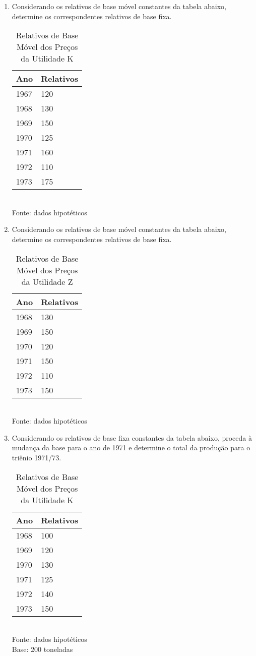 \begin{enumerate}[resume]
\item Considerando os relativos de base móvel constantes da tabela abaixo, determine os correspondentes relativos de base fixa.
	\begin{table}[!htb]
	\centering
	\caption{Relativos de Base Móvel dos Preços da Utilidade K}
	\begin{tabular}{ll}
	Ano & Relativos \\
	\hline 
	1967 & 120  \\
	1968 & 130  \\
	1969 & 150  \\
	1970 & 125  \\
	1971 & 160  \\
	1972 & 110  \\
	1973 & 175  \\		
	\end{tabular} 
	\\ Fonte: dados hipotéticos
	\end{table}
	
\item Considerando os relativos de base móvel constantes da tabela abaixo, determine os correspondentes relativos de base fixa.	
	\begin{table}[!htb]
	\centering
	\caption{Relativos de Base Móvel dos Preços da Utilidade Z}
	\begin{tabular}{ll}
	Ano & Relativos \\
	\hline 
	1968 & 130  \\
	1969 & 150  \\
	1970 & 120  \\
	1971 & 150  \\
	1972 & 110  \\
	1973 & 150  \\		
	\end{tabular} 
	\\ Fonte: dados hipotéticos
	\end{table}
	
\item Considerando os relativos de base fixa constantes da tabela abaixo, proceda à mudança da base para o ano de 1971 e determine o total da produção para o triênio 1971/73.
	\begin{table}[!htb]
	\centering
	\caption{Relativos de Base Móvel dos Preços da Utilidade K}
	\begin{tabular}{ll}
	Ano & Relativos \\
	\hline 
	1968 & 100  \\
	1969 & 120  \\
	1970 & 130  \\
	1971 & 125  \\
	1972 & 140  \\
	1973 & 150  \\		
	\end{tabular} 
	\\ Fonte: dados hipotéticos\\
	Base: 200 toneladas 
	\end{table}
	

\end{enumerate}
